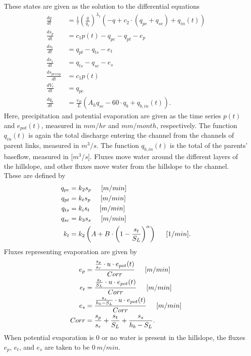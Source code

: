 \documentclass[12pt]{article}
\begin{document}
These states are given as the solution to the differential equations
\begin{align*}
 \frac{dq}{dt} &= \frac{1}{\tau} \left(\frac{q}{q_r}\right)^{\lambda_1} \left( -q + c_2 \cdot (q_{pc} + q_{sc}) + q_{in}(t) \right) \\
 \frac{ds_p}{dt} &= c_1 p(t) - q_{pc} - q_{pt} - e_p \\
 \frac{ds_t}{dt} &= q_{pt} - q_{ts} - e_t \\
 \frac{ds_s}{dt} &= q_{ts} - q_{sc} - e_s \\
 \frac{ds_{precip}}{dt} &= c_1 p(t) \\
 \frac{dV_r}{dt} &= q_{pc} \\
 \frac{dq_b}{dt} &= \frac{v_B}{L} (A_h q_{sc} - 60 \cdot q_b + q_{b,in}(t)).
\end{align*}
Here, precipitation and potential evaporation are given as the time series $p(t)$ and $e_{pot}(t)$, measured in $mm/hr$ and $mm/month$, respectively. The function $q_{in}(t)$ is again the total discharge entering the channel from the channels of parent links, measured in $m^3/s$. The function $q_{b,in}(t)$ is the total of the parents' baseflow, measured in [$m^3/s$]. Fluxes move water around the different layers of the hillslope, and other fluxes move water from the hillslope to the channel. These are defined by
\begin{align*}
 q_{pc} &= k_2 s_p \hspace{.2in} [m/min] \\
 q_{pt} &= k_t s_p \hspace{.2in} [m/min] \\
 q_{ts} &= k_i s_t \hspace{.2in} [m/min] \\
 q_{sc} &= k_3 s_s \hspace{.2in} [m/min] \\
 k_t &= k_2 \left(A + B \cdot \left(1-\frac{s_t}{S_L}\right)^{\alpha}\right) \hspace{.2in} [1/min].
\end{align*}
Fluxes representing evaporation are given by
\begin{align*}
 e_p &= \frac{\frac{s_p}{s_r} \cdot u \cdot e_{pot}(t)}{Corr} \hspace{.2in} [m/min] \\
 e_t &= \frac{\frac{s_t}{S_L} \cdot u \cdot e_{pot}(t)}{Corr} \hspace{.2in} [m/min] \\
 e_s &= \frac{\frac{s_s}{h_b-S_L} \cdot u \cdot e_{pot}(t)}{Corr} \hspace{.2in} [m/min] \\
 Corr &= \frac{s_p}{s_r} + \frac{s_t}{S_L} + \frac{s_s}{h_b-S_L}.
\end{align*}
When potential evaporation is $0$ or no water is present in the hillslope, the fluxes $e_p$, $e_t$, and $e_s$ are taken to be $0\ m/min$.
\end{document}
